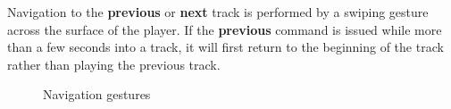 \documentclass[12pt,letterpaper]{article}
\begin{document}
Navigation to the \textbf{previous} or \textbf{next} track is performed by a swiping gesture across the surface of the player. {\color{OliveGreen} If the \textbf{previous} command is issued while more than a few seconds into a track, it will first return to the beginning of the track rather than playing the previous track.}
	\begin{figure}[H]
		\centering
		\hspace{1in}
		\caption{Navigation gestures}
	\end{figure}
\end{document}
